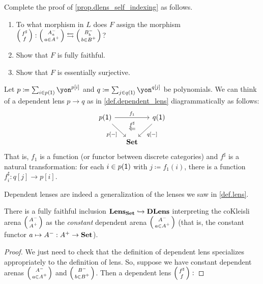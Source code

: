\documentclass[DynamicalBook]{subfiles}
\begin{document}
\begin{exercise}
Complete the proof of \cref{prop.dlens_self_indexing} as follows.
\begin{enumerate}
	\item To what morphism in $L$ does $F$ assign the morphism $\lens{f^{\sharp}}{f} : \lens{A^-_{a}}{a \in A^+}\fromto \lens{B^-_{b}}{b \in B^+}$?
  \item Show that $F$ is fully faithful.
  \item Show that $F$ is essentially surjective.
 \qedhere 
\end{enumerate}
\end{exercise}

\begin{remark}
Let $p\coloneqq\sum_{i\in p(\1)}\yon^{p[i]}$ and $q\coloneqq\sum_{j\in q(\1)}\yon^{q[j]}$ be polynomials. We can think of a dependent lens $p\to q$ as in \cref{def.dependent_lens} diagrammatically as follows:
\begin{equation}\label{eqn.colax_poly_map}
\begin{tikzcd}[column sep=small]
	p(\1)\ar[dr, "{p[-]}"']\ar[rr, "f_1"]&~&
	q(\1)\ar[dl, "{q[-]}"]\\&
	\smset\ar[u, phantom, near end, "\overset{f^\sharp}{\Leftarrow}"]
\end{tikzcd}
\end{equation}
That is, $f_1$ is a function (or functor between discrete categories) and $f^\sharp$ is a natural transformation: for each $i\in p(\textsf{1})$ with $j\coloneqq f_1(i)$, there is a function $f^\sharp_i\colon q[j]\to p[i]$.
\end{remark}

Dependent lenses are indeed a generalization of the lenses we saw in \cref{def.lens}.

\begin{proposition}\label{prop.lenses_are_dependent_lenses}
  There is a fully faithful inclusion $\textbf{Lens}_{\textbf{Set}} \hookrightarrow
  \textbf{DLens}$ interpreting the coKleisli arena $\lens{A^-}{A^+}$ as the \emph{constant}
  dependent arena $\lens{A^-}{a \in A^+}$ (that is, the constant functor $a
  \mapsto A^- : A^+ \to \textbf{Set}$).
\end{proposition}
\begin{proof}
  We just need to check that the definition of dependent lens specializes
  appropriately to the definition of lens. So, suppose we have constant
  dependent arenas $\lens{A^-}{a \in A^+}$ and $\lens{B^-}{b \in B^+}$. Then a
  dependent lens $\lens{f^{\sharp}}{f} : $
\end{proof}
\end{document}
